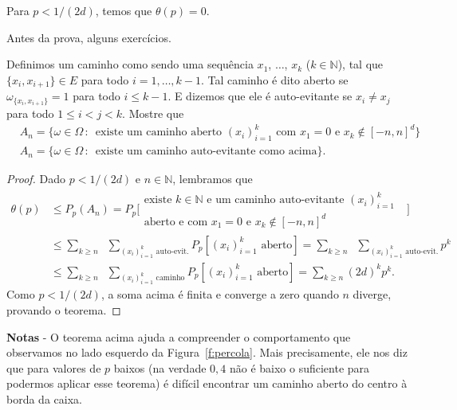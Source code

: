 \begin{topics}
\begin{theorem}
  Para $p < 1/(2d)$, temos que $\theta(p) = 0$.
\end{theorem}

Antes da prova, alguns exercícios.

\begin{exercise}
  Definimos um caminho como sendo uma sequência $x_1$, $\dots$, $x_k$ ($k \in \mathbb{N}$), tal que $\{x_i, x_{i+1}\} \in E$ para todo $i = 1, \dots, k-1$.
  Tal caminho é dito aberto se $\omega_{\{x_i, x_{i+1}\}} = 1$ para todo $i \leq k-1$.
  E dizemos que ele é auto-evitante se $x_i \neq x_j$ para todo $1 \leq i < j < k$.
  Mostre que
  \begin{equation*}
    \begin{split}
      & A_n = \Big\{ \omega \in \Omega \, : \,  \text{ existe um caminho aberto $(x_i)_{i=1}^{k}$ com $x_1 = 0$ e $x_k \not \in [-n, n]^d$} \Big\}\\
      & A_n = \big\{ \omega \in \Omega \, : \, \text{ existe um caminho auto-evitante como acima} \big\}.
    \end{split}
  \end{equation*}
\end{exercise}

\begin{proof}
  Dado $p < 1/(2d)$ e $n \in \mathbb{N}$, lembramos que
  \begin{equation*}
    \begin{split}
      \theta(p) & \leq P_p(A_n) = P_p \Big[
      \begin{array}{c}
      \text{existe $k \in \mathbb{N}$ e um caminho auto-evitante $(x_i)_{i=1}^k$ }\\
      \text{aberto e com $x_1 = 0$ e $x_k \not \in [-n, n]^d$}
    \end{array} \Big]\\[2mm]
    & \leq \sum_{k \geq n} \; \; \sum_{(x_i)_{i=1}^k \text{ auto-evit.}} P_p [(x_i)_{i=1}^k \text{ aberto}] = \sum_{k \geq n} \; \; \sum_{(x_i)_{i=1}^k \text{ auto-evit.}} p^k\\
    & \leq \sum_{k \geq n} \; \; \sum_{(x_i)_{i=1}^k \text{ caminho}} P_p [(x_i)_{i=1}^k \text{ aberto}] = \sum_{k \geq n} (2d)^k p^k.
    \end{split}
  \end{equation*}
  Como $p < 1/(2d)$, a soma acima é finita e converge a zero quando $n$ diverge, provando o teorema.
\end{proof}

{\bf Notas} - O teorema acima ajuda a compreender o comportamento que observamos no lado esquerdo da Figura~\ref{f:percola}.
Mais precisamente, ele nos diz que para valores de $p$ baixos (na verdade $0,4$ não é baixo o suficiente para podermos aplicar esse teorema) é difícil encontrar um caminho aberto do centro à borda da caixa.


\end{topics}
